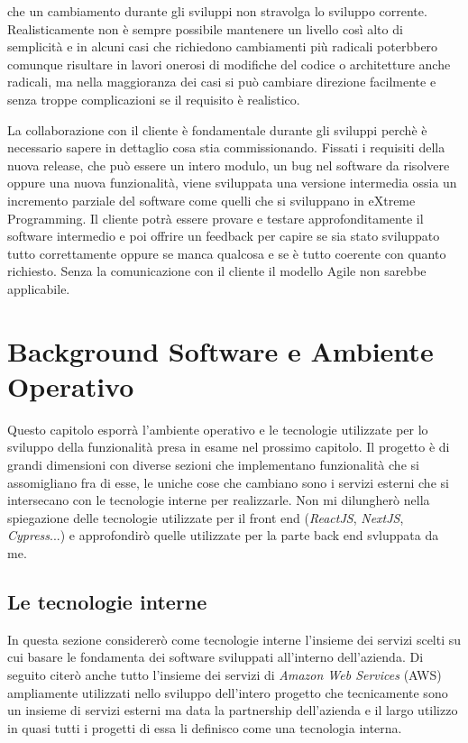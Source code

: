 \documentclass[target=bach,aauheader=,style=]{thud}
\begin{document}
che un cambiamento durante gli sviluppi non stravolga lo sviluppo corrente. Realisticamente non è sempre possibile mantenere un livello così alto di semplicità
e in alcuni casi che richiedono cambiamenti più radicali poterbbero comunque risultare in lavori onerosi di modifiche del codice o architetture anche radicali,
ma nella maggioranza dei casi si può cambiare direzione facilmente e senza troppe complicazioni se il requisito è realistico.
\par La collaborazione con il cliente è fondamentale durante gli sviluppi perchè è necessario sapere in dettaglio cosa stia commissionando.
Fissati i requisiti della nuova release, che può essere un intero modulo, un bug nel software da risolvere oppure una nuova funzionalità, viene sviluppata
una versione intermedia ossia un incremento parziale del software come quelli che si sviluppano in eXtreme Programming. Il cliente potrà essere provare e
testare approfonditamente il software intermedio e poi offrire un feedback per capire se sia stato sviluppato tutto correttamente oppure se manca qualcosa
e se è tutto coerente con quanto richiesto. Senza la comunicazione con il cliente il modello Agile non sarebbe applicabile.

\chapter{Background Software e Ambiente Operativo}

Questo capitolo esporrà l'ambiente operativo e le tecnologie utilizzate per lo sviluppo della funzionalità presa in esame nel prossimo capitolo.
Il progetto è di grandi dimensioni con diverse sezioni che implementano funzionalità che si assomigliano fra di esse, le uniche cose che cambiano
sono i servizi esterni che si intersecano con le tecnologie interne per realizzarle.
Non mi dilungherò nella spiegazione delle tecnologie utilizzate per il front end (\textit{ReactJS}\cite{react_dev_home}, \textit{NextJS}\cite{nextjs_home},
\textit{Cypress}\cite{cypress}...) e approfondirò quelle utilizzate per la parte back end svluppata da me. 
\section{Le tecnologie interne}
In questa sezione considererò come tecnologie interne l'insieme dei servizi scelti su cui basare le fondamenta dei software
sviluppati all'interno dell'azienda. Di seguito citerò anche tutto l'insieme dei servizi di \textit{Amazon Web Services}\cite{aws} (AWS)
ampliamente utilizzati nello sviluppo dell'intero progetto che tecnicamente sono un insieme di servizi esterni ma data la partnership dell'azienda
e il largo utilizzo in quasi tutti i progetti di essa li definisco come una tecnologia interna.
\end{document}
